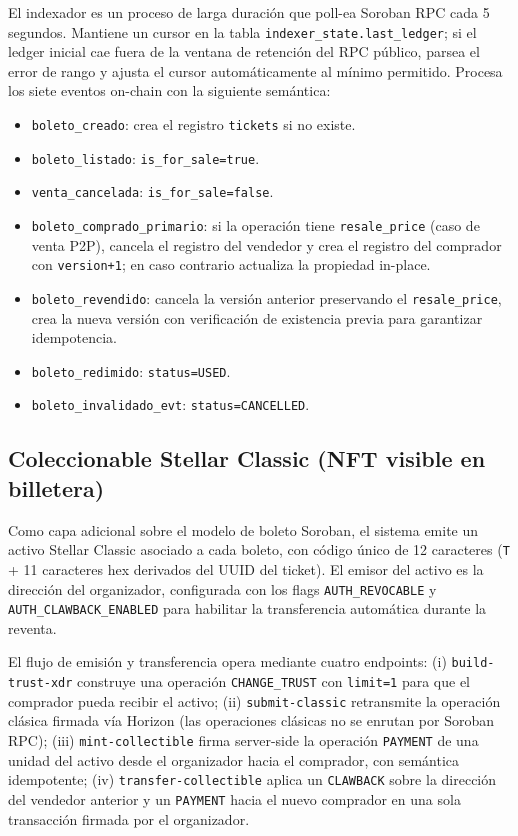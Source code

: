 El indexador es un proceso de larga duración que poll-ea Soroban RPC cada 5 segundos. Mantiene un cursor en la tabla \texttt{indexer\_state.last\_ledger}; si el ledger inicial cae fuera de la ventana de retención del RPC público, parsea el error de rango y ajusta el cursor automáticamente al mínimo permitido. Procesa los siete eventos on-chain con la siguiente semántica:

\begin{itemize}
    \item \texttt{boleto\_creado}: crea el registro \texttt{tickets} si no existe.
    \item \texttt{boleto\_listado}: \texttt{is\_for\_sale=true}.
    \item \texttt{venta\_cancelada}: \texttt{is\_for\_sale=false}.
    \item \texttt{boleto\_comprado\_primario}: si la operación tiene \texttt{resale\_price} (caso de venta P2P), cancela el registro del vendedor y crea el registro del comprador con \texttt{version+1}; en caso contrario actualiza la propiedad in-place.
    \item \texttt{boleto\_revendido}: cancela la versión anterior preservando el \texttt{resale\_price}, crea la nueva versión con verificación de existencia previa para garantizar idempotencia.
    \item \texttt{boleto\_redimido}: \texttt{status=USED}.
    \item \texttt{boleto\_invalidado\_evt}: \texttt{status=CANCELLED}.
\end{itemize}

\subsection{Coleccionable Stellar Classic (NFT visible en billetera)}

Como capa adicional sobre el modelo de boleto Soroban, el sistema emite un activo Stellar Classic asociado a cada boleto, con código único de 12 caracteres (\texttt{T} + 11 caracteres hex derivados del UUID del ticket). El emisor del activo es la dirección del organizador, configurada con los flags \texttt{AUTH\_REVOCABLE} y \texttt{AUTH\_CLAWBACK\_ENABLED} para habilitar la transferencia automática durante la reventa.

El flujo de emisión y transferencia opera mediante cuatro endpoints: (i) \texttt{build-trust-xdr} construye una operación \texttt{CHANGE\_TRUST} con \texttt{limit=1} para que el comprador pueda recibir el activo; (ii) \texttt{submit-classic} retransmite la operación clásica firmada vía Horizon (las operaciones clásicas no se enrutan por Soroban RPC); (iii) \texttt{mint-collectible} firma server-side la operación \texttt{PAYMENT} de una unidad del activo desde el organizador hacia el comprador, con semántica idempotente; (iv) \texttt{transfer-collectible} aplica un \texttt{CLAWBACK} sobre la dirección del vendedor anterior y un \texttt{PAYMENT} hacia el nuevo comprador en una sola transacción firmada por el organizador.

